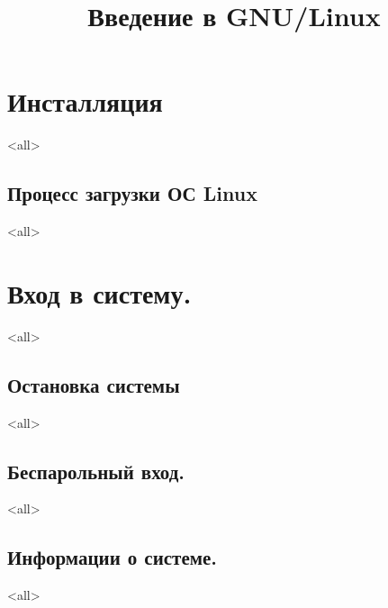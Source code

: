 

\title{Введение в GNU/Linux}




\begin{frame}
	\frametitle{}
	\titlepage
	\vspace{-0.5cm}
	\begin{center}
	\end{center}
\end{frame}


\begin{frame}
	\tableofcontents
	[hideallsubsections]
\end{frame}


\section{Инсталляция}
\mode<all>{}
\subsection{Процесс загрузки ОС Linux}
\mode<all>{}

\section{Вход в систему.}
\mode<all>{}
\subsection{Остановка системы}
\mode<all>{}
\subsection{Беспарольный вход.}
\mode<all>{}
\subsection{Информации о системе.}
\mode<all>{}

